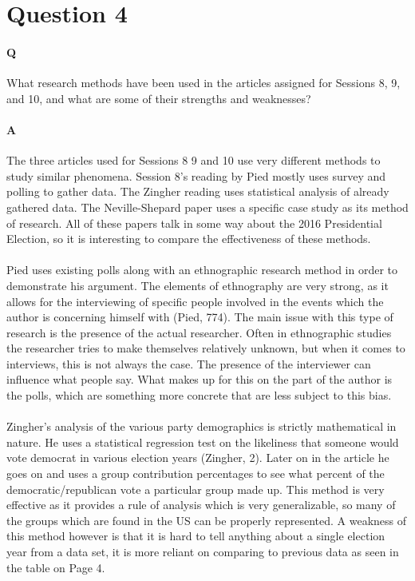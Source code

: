 \documentclass[12pt]{article}
\begin{document}
\section*{Question 4}
\paragraph{Q}
What research methods have been used in the articles assigned for Sessions 8,
9, and 10, and what are some of their strengths and weaknesses?
\paragraph{A}
The three articles used for Sessions 8 9 and 10 use very different
methods to study similar phenomena. Session 8's reading by Pied mostly
uses survey and polling to gather data. The Zingher reading uses
statistical analysis of already gathered data. The Neville-Shepard
paper uses a specific case study as its method of research. All of
these papers talk in some way about the 2016 Presidential Election, so
it is interesting to compare the effectiveness of these methods.
\paragraph{}
Pied uses existing polls along with an ethnographic research method in
order to demonstrate his argument. The elements of ethnography are
very strong, as it allows for the interviewing of specific people
involved in the events which the author is concerning himself with
(Pied, 774). The main issue with this type of research is the presence
of the actual researcher. Often in ethnographic studies the researcher
tries to make themselves relatively unknown, but when it comes to
interviews, this is not always the case. The presence of the
interviewer can influence what people say. What makes up for this on
the part of the author is the polls, which are something more concrete
that are less subject to this bias. 
\paragraph{}
Zingher's analysis of the various party demographics is strictly
mathematical in nature. He uses a statistical regression test on
the likeliness that someone would vote democrat in various election
years (Zingher, 2). Later on in the article he goes on and uses a
group contribution percentages to see what percent of the
democratic/republican vote a particular group made up. This method is
very effective as it provides a rule of analysis which is very
generalizable, so many of the groups which are found in the US can be
properly represented. A weakness of this method however is that it is
hard to tell anything about a single election year from a data set, it
is more reliant on comparing to previous data as seen in the table on
Page 4. 
\end{document}
